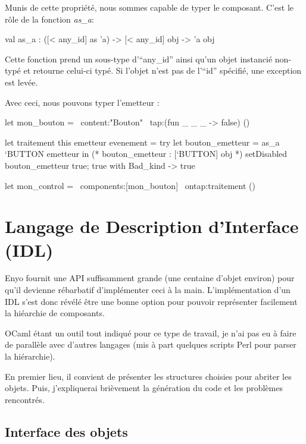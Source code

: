 \documentclass[11pt,a4paper]{report}
\begin{document}
Munis de cette propriété, nous sommes capable de typer le composant.
C'est le rôle de la fonction \emph{as\_a}:

\begin{OCaml}
  val as_a : ([< any_id] as 'a) -> [< any_id] obj -> 'a obj
\end{OCaml}

Cette fonction prend un sous-type d'``any\_id'' ainsi qu'un objet instancié non-typé et retourne 
celui-ci typé. Si l'objet n'est pas de l'``id'' spécifié, une exception est levée.

Avec ceci, nous pouvons typer l'emetteur :
\begin{OCaml}
  let mon_bouton = ~content:"Bouton" ~tap:(fun _ _ _ -> false) ()

  let traitement this emetteur evenement =
     try 
         let bouton_emetteur = as_a `BUTTON emetteur in
         (* bouton_emetteur : [`BUTTON] obj *)
         setDisabled bouton_emetteur true;
         true
     with Bad_kind -> true

  let mon_control = ~components:[mon_bouton] ~ontap:traitement ()
\end{OCaml}




\chapter{Langage de Description d'Interface (IDL)}\label{chap:idl}

Enyo fournit une API suffisamment grande (une centaine d'objet environ) pour qu'il devienne 
rébarbatif d'implémenter ceci à la main. L'implémentation d'un IDL s'est donc révélé être 
une bonne option pour pouvoir représenter facilement la hiéarchie de composants.

OCaml étant un outil tout indiqué pour ce type de travail, je n'ai pas eu à faire de parallèle 
avec d'autres langages (mis à part quelques scripts Perl pour parser la hiérarchie).

En premier lieu, il convient de présenter les structures choisies pour abriter les objets.
Puis, j'expliquerai brièvement la génération du code et les problèmes rencontrés.

\section{Interface des objets}
\end{document}
